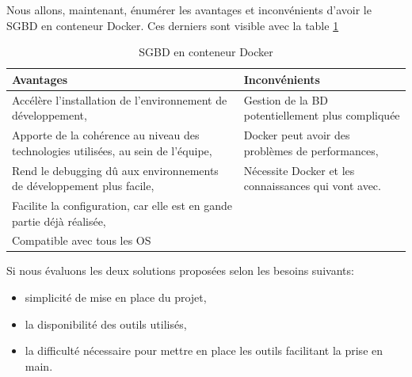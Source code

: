 \documentclass[
    iai, %
    il, %
]{heig-tb}
\begin{document}
Nous allons, maintenant, énumérer les avantages et inconvénients d'avoir le SGBD en conteneur
Docker. Ces derniers sont visible avec la table \ref{dev-sgbd-docker}

\begin{table}[h]
    \begin{center}
        \caption{SGBD en conteneur Docker \label{dev-sgbd-docker}}
        \begin{tabularx}{1.0\textwidth} {X|X}
            Avantages                             & Inconvénients                                                         \\ \hline
            Accélère l'installation de l'environnement de développement,
            \cite{labrecque,data-flair-pros-cons} & Gestion de la BD
            potentiellement plus compliquée                                                                               \\
            Apporte de la cohérence au niveau des technologies utilisées, au sein de l'équipe,
            \cite{labrecque,data-flair-use-cases} & Docker peut avoir des problèmes de performances,
            \cite{labrecque}                                                                                              \\
            Rend le debugging dû aux environnements de développement plus facile,
            \cite{labrecque,koukia}               & Nécessite Docker et les connaissances qui vont avec. \cite{labrecque} \\
            Facilite la configuration, car elle est en gande partie déjà réalisée,
            \cite{data-flair-pros-cons}           &                                                                       \\
            Compatible avec tous les OS           &                                                                       \\
        \end{tabularx}
    \end{center}
\end{table}

Si nous évaluons les deux solutions proposées selon les besoins suivants:
\begin{itemize}
    \item simplicité de mise en place du projet,
    \item la disponibilité des outils utilisés,
    \item la difficulté nécessaire pour mettre en place les outils facilitant la prise en main.
\end{itemize}
\end{document}
